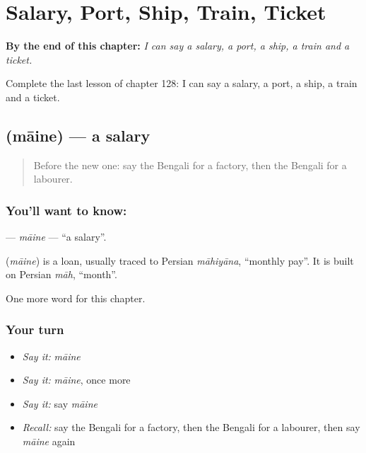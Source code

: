 
\chapter{Salary, Port, Ship, Train, Ticket}
\label{ch:bn-salary-port-ship-train-ticket}

\begin{chapteropening}
\textbf{By the end of this chapter:} \emph{I can say a salary, a port, a ship, a train and a ticket.}

Complete the last lesson of chapter 128: I can say a salary, a port, a ship, a train and a ticket.
\end{chapteropening}

\section[\texorpdfstring{\bn{মাইনে} (māine)}{মাইনে (māine)}]{ (māine) — a salary}

\label{lesson:BN-C128-maine}



\begin{quote}
Before the new one: say the Bengali for a factory, then the Bengali for a labourer.
\end{quote}

\subsection*{You'll want to know: }
\textbf{} — \emph{māine} — \textquotedblleft{}a salary\textquotedblright{}.

\begin{cousinweb}
\textbf{} (\emph{māine}) is a loan, usually traced to Persian \emph{māhiyāna}, \textquotedblleft{}monthly pay\textquotedblright{}. It is built on Persian \emph{māh}, \textquotedblleft{}month\textquotedblright{}.
\end{cousinweb}

\begin{grammarlens}[title={What you've built}]
One more word for this chapter.
\end{grammarlens}

\subsection*{Your turn}
\begin{itemize}
\raggedright
  \item \emph{Say it:} \emph{māine}
  \item \emph{Say it:} \emph{māine}, once more
  \item \emph{Say it:} say \emph{māine}
  \item \emph{Recall:} say the Bengali for a factory, then the Bengali for a labourer, then say \emph{māine} again
\end{itemize}

